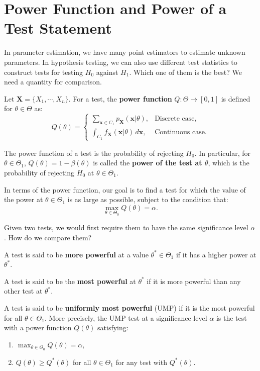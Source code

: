\documentclass{huhtakm-template-book-v2}
\begin{document}
\section{Power Function and Power of a Test Statement}
    In parameter estimation, we have many point estimators to estimate unknown parameters. In hypothesis testing, we can also use different test statistics to construct tests for testing $H_{0}$ against $H_{1}$. Which one of them is the best? We need a quantity for comparison.
    \begin{defn}
        Let $\mathbf{X}=\{X_{1},\cdots,X_{n}\}$. For a test, the \textbf{power function} $Q:\Theta\to[0,1]$ is defined for $\theta\in\Theta$ as:
        \begin{equation*}
            Q(\theta)=\begin{cases}
                \sum_{\mathbf{x}\in C_{1}}p_{\mathbf{X}}(\mathbf{x}|\theta), &\text{Discrete case,}\\
                \int_{C_{1}}f_{\mathbf{X}}(\mathbf{x}|\theta)\,d\mathbf{x}, &\text{Continuous case.}
            \end{cases}
        \end{equation*}
    \end{defn}
    \begin{rem}
        The power function of a test is the probability of rejecting $H_{0}$. In particular, for $\theta\in\Theta_{1}$, $Q(\theta)=1-\beta(\theta)$ is called the \textbf{power of the test at $\theta$}, which is the probability of rejecting $H_{0}$ at $\theta\in\Theta_{1}$.
    \end{rem}
    \begin{rem}
        In terms of the power function, our goal is to find a test for which the value of the power at $\theta\in\Theta_{1}$ is as large as possible, subject to the condition that:
        \begin{equation*}
            \max_{\theta\in\Theta_{0}}Q(\theta)=\alpha.
        \end{equation*}
    \end{rem}
    Given two tests, we would first require them to have the same significance level $\alpha$. How do we compare them?
    \begin{defn}
        A test is said to be \textbf{more powerful} at a value $\theta^{*}\in\Theta_{1}$ if it has a higher power at $\theta^{*}$.
        
        A test is said to be the \textbf{most powerful} at $\theta^{*}$ if it is more powerful than any other test at $\theta^{*}$.
        
        A test is said to be \textbf{uniformly most powerful} (UMP) if it is the most powerful for all $\theta\in\Theta_{1}$. More precisely, the UMP test at a significance level $\alpha$ is the test with a power function $Q(\theta)$ satisfying:
        \begin{enumerate}
            \item $\max_{\theta\in\Theta_{0}}Q(\theta)=\alpha,$
            \item $Q(\theta)\geq Q^{*}(\theta)$ for all $\theta\in\Theta_{1}$ for any test with $Q^{*}(\theta).$
        \end{enumerate}
    \end{defn}
\end{document}
